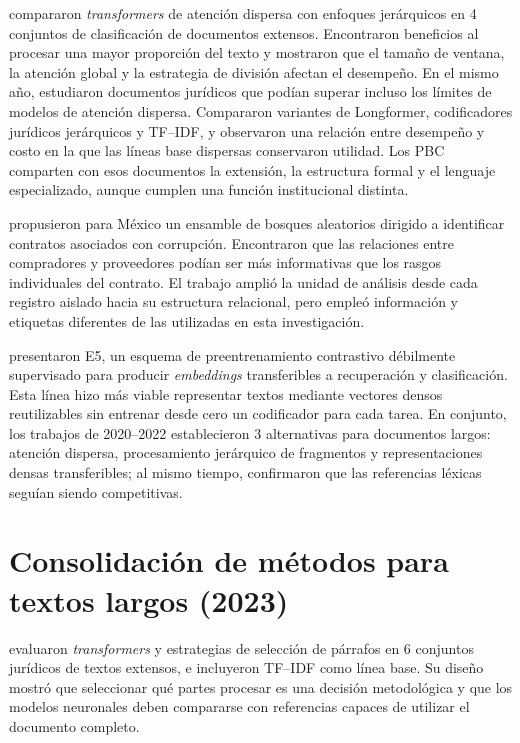 \textcite{dai2022revisiting} compararon \textit{transformers} de atención dispersa con enfoques jerárquicos en 4 conjuntos de clasificación de documentos extensos. Encontraron beneficios al procesar una mayor proporción del texto y mostraron que el tamaño de ventana, la atención global y la estrategia de división afectan el desempeño. En el mismo año, \textcite{mamakas2022legal} estudiaron documentos jurídicos que podían superar incluso los límites de modelos de atención dispersa. Compararon variantes de Longformer, codificadores jurídicos jerárquicos y TF--IDF, y observaron una relación entre desempeño y costo en la que las líneas base dispersas conservaron utilidad. Los PBC comparten con esos documentos la extensión, la estructura formal y el lenguaje especializado, aunque cumplen una función institucional distinta.

\textcite{aldana2022mexico} propusieron para México un ensamble de bosques aleatorios dirigido a identificar contratos asociados con corrupción. Encontraron que las relaciones entre compradores y proveedores podían ser más informativas que los rasgos individuales del contrato. El trabajo amplió la unidad de análisis desde cada registro aislado hacia su estructura relacional, pero empleó información y etiquetas diferentes de las utilizadas en esta investigación.

\textcite{wang2022e5} presentaron E5, un esquema de preentrenamiento contrastivo débilmente supervisado para producir \textit{embeddings} transferibles a recuperación y clasificación. Esta línea hizo más viable representar textos mediante vectores densos reutilizables sin entrenar desde cero un codificador para cada tarea. En conjunto, los trabajos de 2020--2022 establecieron 3 alternativas para documentos largos: atención dispersa, procesamiento jerárquico de fragmentos y representaciones densas transferibles; al mismo tiempo, confirmaron que las referencias léxicas seguían siendo competitivas.

\section{Consolidación de métodos para textos largos (2023)}

\textcite{tuteja2023longtext} evaluaron \textit{transformers} y estrategias de selección de párrafos en 6 conjuntos jurídicos de textos extensos, e incluyeron TF--IDF como línea base. Su diseño mostró que seleccionar qué partes procesar es una decisión metodológica y que los modelos neuronales deben compararse con referencias capaces de utilizar el documento completo.

